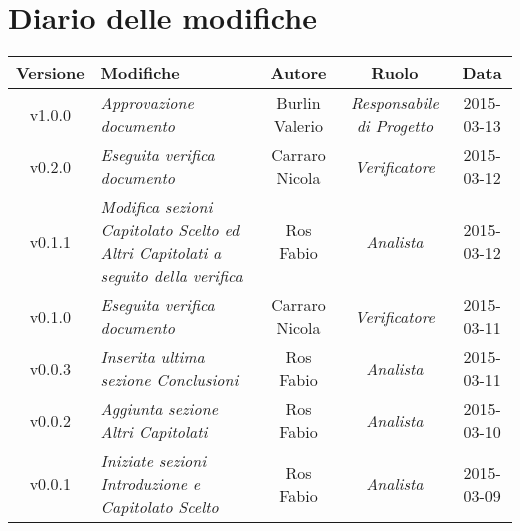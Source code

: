 \newpage
\section*{Diario delle modifiche}

\begin{table}[h]
\centering
\begin{tabular}{|c|p{}|c|c|c|}
	\toprule
		\textbf{Versione} & \textbf{Modifiche} & \textbf{Autore} & \textbf{Ruolo} & \textbf{Data} \\
	\midrule
	\midrule
		v1.0.0 & \textit{Approvazione documento} & Burlin Valerio & \textit{Responsabile di Progetto} & 2015-03-13\\
	\midrule
		v0.2.0 & \textit{Eseguita verifica documento} & Carraro Nicola & \textit{Verificatore} & 2015-03-12\\
	\midrule
		v0.1.1 & \textit{Modifica sezioni Capitolato Scelto ed Altri Capitolati a seguito della verifica} & Ros Fabio & \textit{Analista} & 2015-03-12\\
	\midrule
		v0.1.0 & \textit{Eseguita verifica documento} & Carraro Nicola & \textit{Verificatore} & 2015-03-11\\
	\midrule
		v0.0.3 & \textit{Inserita ultima sezione Conclusioni} & Ros Fabio & \textit{Analista} & 2015-03-11\\
	\midrule
		v0.0.2 & \textit{Aggiunta sezione Altri Capitolati} & Ros Fabio & \textit{Analista} & 2015-03-10\\
	\midrule
		v0.0.1 & \textit{Iniziate sezioni Introduzione e Capitolato Scelto} & Ros Fabio & \textit{Analista} & 2015-03-09\\
	\bottomrule
\end{tabular}
\end{table}

\newpage
